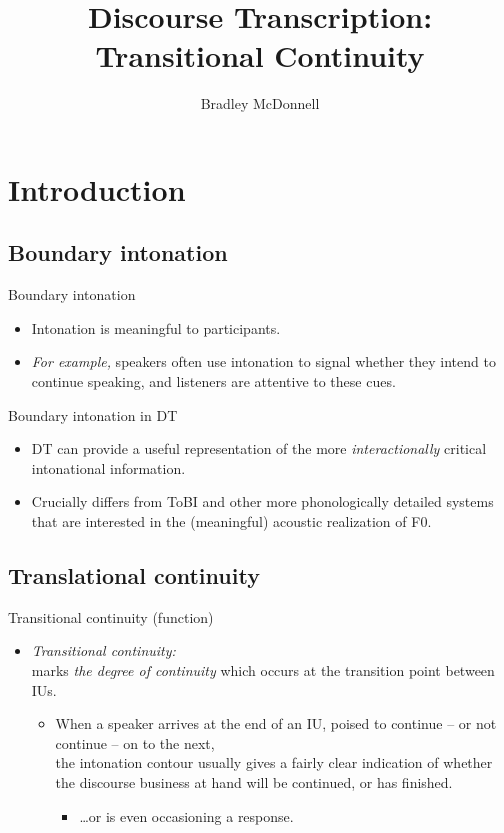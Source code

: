 \documentclass[compress,12pt]{beamer}%
\title[DT: Boundary]{\Large Discourse Transcription: Transitional Continuity}
\author[Bradley McDonnell]{\normalsize Bradley McDonnell}
\institute{\normalsize\color{bluish}{LING710\\University of Hawai‘i at Mānoa}}
\begin{document}
  \begin{frame}[label=intro]
      \titlepage
  \end{frame}

\section{Introduction}
\subsection{Boundary intonation}  
  \begin{frame}{Boundary intonation}
    \begin{itemize}
      \item Intonation is meaningful to participants.
      \item \emph{For example,} speakers often use intonation to signal whether they intend to continue speaking, and listeners are attentive to these cues.
    \end{itemize}
  \end{frame}
  
  \begin{frame}{Boundary intonation in DT}
   \begin{itemize}
     \item DT can provide a useful representation of the more \textit{interactionally} critical intonational information.
     \item Crucially differs from ToBI and other more phonologically detailed systems that are interested in the (meaningful) acoustic realization of F0.
    \end{itemize}
  \end{frame}
  
\subsection{Translational continuity}
  \begin{frame}{Transitional continuity (function)}
    \begin{itemize}
      \item[] \emph{Transitional continuity:}
      \\
      marks \textit{the degree of continuity} which occurs at the transition point between IUs.
    \begin{itemize}
      \item When a speaker arrives at the end of an IU, poised to continue – or not continue – on to the next,\\the intonation contour usually gives a fairly clear indication of whether the discourse business at hand will be continued, or has finished.
      \begin{itemize}
        \item \ldots or is even occasioning a response.
      \end{itemize}
    \end{itemize}
    \end{itemize}
    \end{frame}
    
\end{document}
